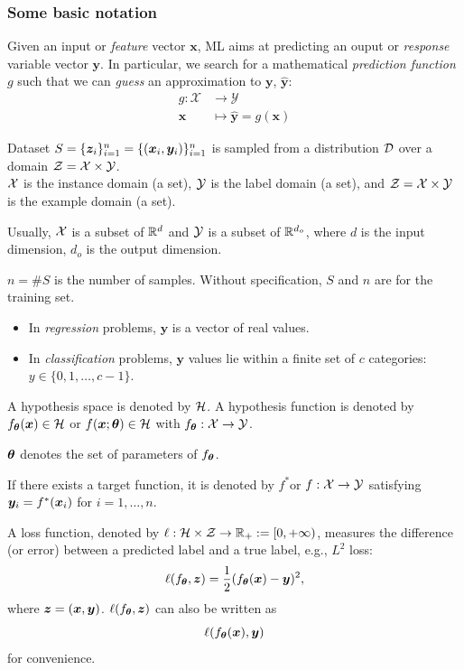 \documentclass{beamer}
\begin{document}
\begin{frame}[allowframebreaks]
  \frametitle{Some basic notation}

  Given an input or {\em feature} vector $\bm{x}$, ML aims at predicting an ouput or {\em response} variable vector $\bm{y}$. In particular, we search for a mathematical {\em prediction function} $g$ such that we can {\em guess} an approximation to $\bm{y}$, $\hat{\bm{y}}$:
  \begin{align*}
      g \colon \mathcal{X}  & \rightarrow \mathcal{Y}\\
      \bm{x}                &\mapsto \hat{\bm{y}}=g(\bm{x})
  \end{align*}

  \begin{definition}
    Dataset  $S=\{\bm{z}_i\}_{i=1}^n=\{(\bm{x}_i,\bm{y}_i)\}_{i=1}^n$ is sampled from a distribution $\mathcal{D}$ over a domain $\mathcal{Z}=\mathcal{X}\times\mathcal{Y}$.\\
    $\mathcal{X}$  is the instance domain (a set), $\mathcal{Y}$ is the label domain (a set), and $\mathcal{Z}=\mathcal{X}\times\mathcal{Y}$ is the example domain (a set).
  \end{definition}
  
  Usually,
  $\mathcal{X}$ is a subset of $\mathbb{R}^d$ and $\mathcal{Y}$ is a subset of $\mathbb{R}^{d_{o}}$, where $d$ is the input dimension, $d_{o}$ is the output dimension.
  
  $n=\#S$ is the number of samples. Without specification, $S$ and $n$ are for the training set.

  \begin{itemize}
    \item In {\em regression} problems, $\bm{y}$ is a vector of real values.
    \item In {\em classification} problems, $\bm{y}$ values lie within a finite set of $c$ categories: $y\in\{0, 1, \ldots, c-1\}$.
  \end{itemize}

  \begin{definition}  
  A hypothesis space is denoted by $\mathcal{H}$. A hypothesis function is denoted by $f_{\bm{\theta}}(\bm{x})\in\mathcal{H}$ or $f(\bm{x};\bm{\theta})\in\mathcal{H}$ with $f_{\bm{\theta}}:\mathcal{X}\to\mathcal{Y}$.
  \end{definition}
  
  $\bm{\theta}$  denotes the set of parameters of $f_{\bm{\theta}}$.
  
  If there exists a target function, it is denoted by $f^*$or $f:\mathcal{X}\to\mathcal{Y}$ satisfying $\bm{y}_i=f^*(\bm{x}_i)$ for $i=1,\ldots,n$.
  
  A loss function, denoted by $\ell:\mathcal{H}\times\mathcal{Z}\to\mathbb{R}_+:=[0,+\infty)$, measures the difference (or error) between a predicted label and a true label, e.g., $L^2$ loss:
  \[
      \ell(f_{\bm{\theta}},\bm{z})=\frac{1}{2}(f_{\bm{\theta}}(\bm{x})-\bm{y})^2,
  \]
  where $\bm{z}=(\bm{x},\bm{y})$. $\ell(f_{\bm{\theta}},\bm{z})$ can also be written as
  \[
      \ell(f_{\bm{\theta}}(\bm{x}),\bm{y})
  \]
  for convenience.
  

\end{frame}
\end{document}
